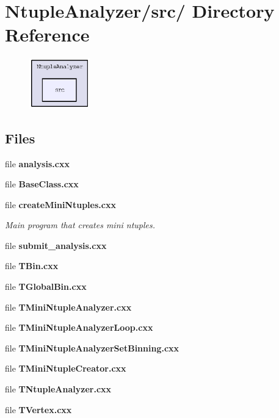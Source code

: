 \section{Ntuple\-Analyzer/src/ Directory Reference}
\label{dir_e0455448f75b34d77084fa07ab7c9074}


\begin{figure}[H]
\begin{center}
\leavevmode
\includegraphics[width=74pt]{dir_e0455448f75b34d77084fa07ab7c9074_dep}
\end{center}
\end{figure}
\subsection*{Files}
\begin{CompactItemize}
\item 
file \textbf{analysis.cxx}
\item 
file \textbf{Base\-Class.cxx}
\item 
file \bf{create\-Mini\-Ntuples.cxx}
\begin{CompactList}\small\item\em Main program that creates mini ntuples. \item\end{CompactList}

\item 
file \textbf{submit\_\-analysis.cxx}
\item 
file \textbf{TBin.cxx}
\item 
file \textbf{TGlobal\-Bin.cxx}
\item 
file \textbf{TMini\-Ntuple\-Analyzer.cxx}
\item 
file \textbf{TMini\-Ntuple\-Analyzer\-Loop.cxx}
\item 
file \textbf{TMini\-Ntuple\-Analyzer\-Set\-Binning.cxx}
\item 
file \textbf{TMini\-Ntuple\-Creator.cxx}
\item 
file \textbf{TNtuple\-Analyzer.cxx}
\item 
file \textbf{TVertex.cxx}
\end{CompactItemize}
